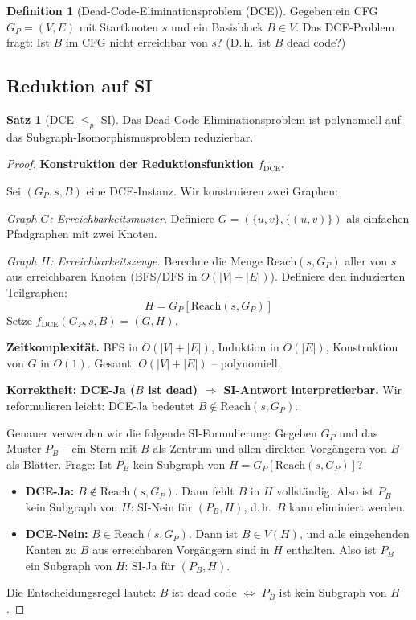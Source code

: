 ﻿\documentclass[a4paper,12pt]{article}
\theoremstyle{definition}
\newtheorem{definition}{Definition}
\newtheorem{satz}{Satz}
\begin{document}
\begin{definition}[Dead-Code-Eliminationsproblem (DCE)]
\label{def:dce}
Gegeben ein CFG $G_P = (V, E)$ mit Startknoten $s$ und ein Basisblock $B \in V$. Das DCE-Problem fragt: Ist $B$ im CFG nicht erreichbar von $s$? (D.\,h.\ ist $B$ dead code?)
\end{definition}

\subsection{Reduktion auf SI}

\begin{satz}[DCE $\leq_p$ SI]
\label{satz:dce-si}
Das Dead-Code-Eliminationsproblem ist polynomiell auf das Subgraph-Isomorphismusproblem reduzierbar.
\end{satz}

\begin{proof}
\textbf{Konstruktion der Reduktionsfunktion $f_{\text{DCE}}$.}

Sei $(G_P, s, B)$ eine DCE-Instanz. Wir konstruieren zwei Graphen:

\textit{Graph $G$: Erreichbarkeitsmuster.}
Definiere $G = (\{u, v\}, \{(u, v)\})$ als einfachen Pfadgraphen mit zwei Knoten.

\textit{Graph $H$: Erreichbarkeitszeuge.}
Berechne die Menge $\text{Reach}(s, G_P)$ aller von $s$ aus erreichbaren Knoten (BFS/DFS in $O(|V| + |E|)$). Definiere den induzierten Teilgraphen:
\[
H = G_P[\text{Reach}(s, G_P)]
\]
Setze $f_{\text{DCE}}(G_P, s, B) = (G, H)$.

\textbf{Zeitkomplexität.}
BFS in $O(|V| + |E|)$, Induktion in $O(|E|)$, Konstruktion von $G$ in $O(1)$. Gesamt: $O(|V| + |E|)$ -- polynomiell.

\textbf{Korrektheit: DCE-Ja ($B$ ist dead) $\Rightarrow$ SI-Antwort interpretierbar.}
Wir reformulieren leicht: DCE-Ja bedeutet $B \notin \text{Reach}(s, G_P)$.

Genauer verwenden wir die folgende SI-Formulierung: Gegeben $G_P$ und das Muster $P_B$ -- ein Stern mit $B$ als Zentrum und allen direkten Vorgängern von $B$ als Blätter. Frage: Ist $P_B$ kein Subgraph von $H = G_P[\text{Reach}(s, G_P)]$?

\begin{itemize}
    \item \textbf{DCE-Ja:} $B \notin \text{Reach}(s, G_P)$. Dann fehlt $B$ in $H$ vollständig. Also ist $P_B$ kein Subgraph von $H$: SI-Nein für $(P_B, H)$, d.\,h.\ $B$ kann eliminiert werden.
    \item \textbf{DCE-Nein:} $B \in \text{Reach}(s, G_P)$. Dann ist $B \in V(H)$, und alle eingehenden Kanten zu $B$ aus erreichbaren Vorgängern sind in $H$ enthalten. Also ist $P_B$ ein Subgraph von $H$: SI-Ja für $(P_B, H)$.
\end{itemize}

Die Entscheidungsregel lautet: $B$ ist dead code $\Leftrightarrow$ $P_B$ ist kein Subgraph von $H$.
\end{proof}
\end{document}
